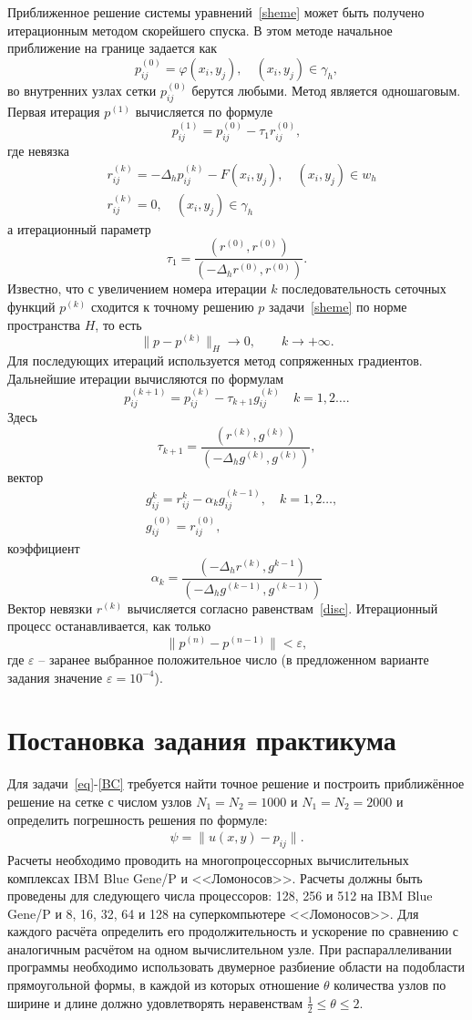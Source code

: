 \documentclass[11pt]{article}
\numberwithin{equation}{section}
\theoremstyle{plain}
\theoremstyle{definition}
\begin{document}
Приближенное решение системы уравнений~\eqref{sheme} может быть получено итерационным
методом скорейшего спуска. В этом методе начальное приближение на границе задается как
\[p_{ij}^{(0)}=\varphi(x_{i},y_{j}),\quad (x_{i},y_{j})\in\gamma_{h},\]
во внутренних узлах сетки \(p_{ij}^{(0)}\) берутся любыми. Метод является одношаговым.
Первая итерация \(p^{(1)}\) вычисляется по формуле
\[p_{ij}^{(1)}=p_{ij}^{(0)}-\tau_{1}r_{ij}^{(0)},\]
где невязка
\begin{equation}
\label{disc}
\begin{aligned}
&r_{ij}^{(k)}=-\Delta_{h}p_{ij}^{(k)}-F(x_i,y_j),\quad (x_{i},y_{j})\in w_{h}\\
&r_{ij}^{(k)}=0,\quad (x_i,y_j)\in\gamma_{h}
\end{aligned}
\end{equation}
а итерационный параметр
\[\tau_{1}=\dfrac{(r^{(0)},r^{(0)})}{(-\Delta_h r^{(0)},r^{(0)})}.\]
Известно, что с увеличением номера итерации \(k\) последовательность сеточных функций \(p^{(k)}\)
сходится к точному решению \(p\) задачи~\eqref{sheme} по норме пространства \(H\), то есть
\[\|p-p^{(k)}\|_{H}\rightarrow 0,\qquad k\rightarrow+\infty. \]
Для последующих итераций используется метод сопряженных градиентов.
Дальнейшие итерации вычисляются по формулам
\[p_{ij}^{(k+1)}=p_{ij}^{(k)}-\tau_{k+1}g_{ij}^{(k)}\quad k=1,2\ldots.\]
Здесь
\[\tau_{k+1}=\dfrac{(r^{(k)},g^{(k)})}{(-\Delta_h g^{(k)},g^{(k)})},\]
вектор
\[\begin{aligned}
&g_{ij}^{k}=r_{ij}^{k}-\alpha_{k}g_{ij}^{(k-1)},\quad k=1,2\ldots,\\
&g_{ij}^{(0)}=r_{ij}^{(0)},
\end{aligned}\]
коэффициент
\[\alpha_{k}=\dfrac{(-\Delta_{h}r^{(k)},g^{k-1})}{(-\Delta_h g^{(k-1)},g^{(k-1)})}\]
Вектор невязки \(r^{(k)}\) вычисляется согласно равенствам~\eqref{disc}. Итерационный процесс останавливается, как только
\[\|p^{(n)}-p^{(n-1)}\|<\varepsilon,\]
где \(\varepsilon\) – заранее выбранное положительное число (в предложенном
варианте задания значение \(\varepsilon=10^{-4}\)).

\section{Постановка задания практикума}
Для задачи~\eqref{eq}-\eqref{BC} требуется найти точное решение и построить
приближённое решение на сетке с числом узлов $N_1 = N_2 = 1000$ и
$N_1 = N_2 = 2000$ и определить погрешность решения по формуле:
\[\begin{aligned}
    \psi=\|u(x,y)-p_{ij}\|.
\end{aligned}\]
Расчеты необходимо проводить на многопроцессорных вычислительных комплексах IBM
Blue Gene/P и <<Ломоносов>>.
Расчеты должны быть проведены для следующего числа процессоров: 128, 256 и 512 на
IBM Blue Gene/P и  8, 16, 32, 64 и 128 на суперкомпьютере <<Ломоносов>>.
Для каждого расчёта определить его
продолжительность и ускорение по сравнению с аналогичным расчётом на одном
вычислительном узле.  При распараллеливании программы необходимо использовать
двумерное разбиение области на подобласти прямоугольной формы, в каждой из
которых отношение $\theta$ количества узлов по ширине и длине должно удовлетворять
неравенствам $\frac{1}{2} \leqslant \theta \leqslant 2$.
\end{document}
